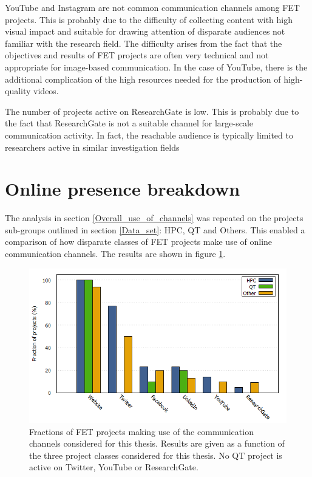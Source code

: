 YouTube and Instagram are not common communication channels among FET projects. This is probably due to the difficulty of collecting content with high visual impact and suitable for drawing attention of disparate audiences not familiar with the research field. The difficulty arises from the fact that the objectives and results of FET projects are often very technical and not appropriate for image-based communication. In the case of YouTube, there is the additional complication of the high resources needed for the production of high-quality videos.

The number of projects active on ResearchGate is low. This is probably due to the fact that ResearchGate is not a suitable channel for large-scale communication activity. In fact, the reachable audience is typically limited to researchers active in similar investigation fields

\section{Online presence breakdown} \label{Online_presence_breakdown}
The analysis in section \ref{Overall_use_of_channels} was repeated on the projects sub-groups outlined in section \ref{Data_set}: HPC, QT and Others. This enabled a comparison of how disparate classes of FET projects make use of online communication channels. The results are shown in figure \ref{Social_media_breakdown}. 

\begin{figure}[!t] 
 \begin{center}
 \includegraphics[scale=0.4]{Images/Social_media_breakdown.png}
 \caption{Fractions of FET projects making use of the communication channels considered for this thesis. Results are given as a function of the three project classes considered for this thesis. No QT project is active on Twitter, YouTube or ResearchGate.}
 \label{Social_media_breakdown}
 \end{center}
\end{figure}

